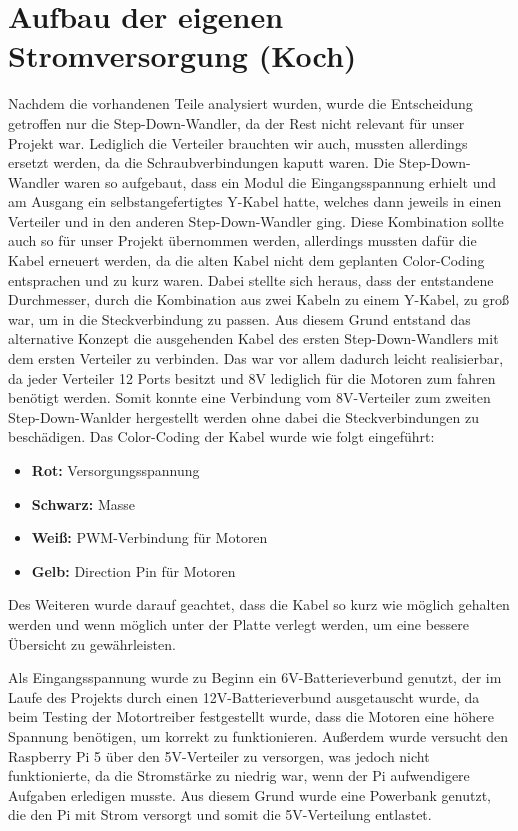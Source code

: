 \section{Aufbau der eigenen Stromversorgung (Koch)}
Nachdem die vorhandenen Teile analysiert wurden, wurde die Entscheidung getroffen nur die Step-Down-Wandler, da der Rest nicht relevant für unser Projekt war. Lediglich die Verteiler brauchten wir auch, mussten allerdings ersetzt werden, da die Schraubverbindungen kaputt waren.
Die Step-Down-Wandler waren so aufgebaut, dass ein Modul die Eingangsspannung erhielt und am Ausgang ein selbstangefertigtes Y-Kabel hatte, welches dann jeweils in einen Verteiler und in den anderen Step-Down-Wandler ging.
Diese Kombination sollte auch so für unser Projekt übernommen werden, allerdings mussten dafür die Kabel erneuert werden, da die alten Kabel nicht dem geplanten Color-Coding entsprachen und zu kurz waren. Dabei stellte sich heraus, dass der entstandene Durchmesser, durch die Kombination aus zwei Kabeln zu einem Y-Kabel, zu groß war, um in die Steckverbindung zu passen.
Aus diesem Grund entstand das alternative Konzept die ausgehenden Kabel des ersten Step-Down-Wandlers mit dem ersten Verteiler zu verbinden. Das war vor allem dadurch leicht realisierbar, da jeder Verteiler 12 Ports besitzt und 8V lediglich für die Motoren zum fahren benötigt werden. Somit konnte eine Verbindung vom 8V-Verteiler zum zweiten Step-Down-Wanlder hergestellt werden ohne dabei die Steckverbindungen zu beschädigen.
\newpage
Das Color-Coding der Kabel wurde wie folgt eingeführt:
\begin{itemize}
    \item \textbf{Rot:} Versorgungsspannung
    \item \textbf{Schwarz:} Masse
    \item \textbf{Weiß:} PWM-Verbindung für Motoren
    \item \textbf{Gelb:} Direction Pin für Motoren
\end{itemize}
Des Weiteren wurde darauf geachtet, dass die Kabel so kurz wie möglich gehalten werden und wenn möglich unter der Platte verlegt werden, um eine bessere Übersicht zu gewährleisten.

Als Eingangsspannung wurde zu Beginn ein 6V-Batterieverbund genutzt, der im Laufe des Projekts durch einen 12V-Batterieverbund ausgetauscht wurde, da beim Testing der Motortreiber festgestellt wurde, dass die Motoren eine höhere Spannung benötigen, um korrekt zu funktionieren. Außerdem wurde versucht den Raspberry Pi 5 über den 5V-Verteiler zu versorgen, was jedoch nicht funktionierte, da die Stromstärke zu niedrig war, wenn der Pi aufwendigere Aufgaben erledigen musste. Aus diesem Grund wurde eine Powerbank genutzt, die den Pi mit Strom versorgt und somit die 5V-Verteilung entlastet.

